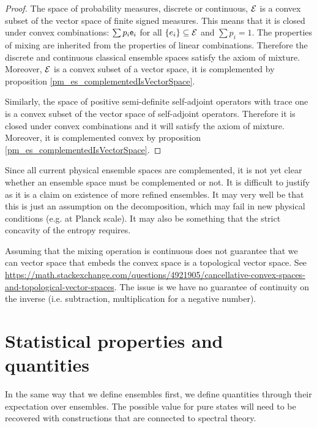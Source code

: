 \begin{proof}
	The space of probability measures, discrete or continuous, $\mathcal{E}$ is a convex subset of the vector space of finite signed measures. This means that it is closed under convex combinations: $\sum p_i \mathsf{e}_i$ for all $\{e_i\} \subseteq \mathcal{E}$ and $\sum p_i = 1$. The properties of mixing are inherited from the properties of linear combinations. Therefore the discrete and continuous classical ensemble spaces satisfy the axiom of mixture. Moreover, $\mathcal{E}$ is a convex subset of a vector space, it is complemented by proposition \ref{pm_es_complementedIsVectorSpace}.
	
	Similarly, the space of positive semi-definite self-adjoint operators with trace one is a convex subset of the vector space of self-adjoint operators. Therefore it is closed under convex combinations and it will satisfy the axiom of mixture. Moreover, it is complemented convex by proposition \ref{pm_es_complementedIsVectorSpace}.
\end{proof}


\begin{remark}
	Since all current physical ensemble spaces are complemented, it is not yet clear whether an ensemble space must be complemented or not. It is difficult to justify as it is a claim on existence of more refined ensembles. It may very well be that this is just an assumption on the decomposition, which may fail in new physical conditions (e.g. at Planck scale). It may also be something that the strict concavity of the entropy requires.
\end{remark}

\begin{remark}
	Assuming that the mixing operation is continuous does not guarantee that we can vector space that embeds the convex space is a topological vector space. See \url{https://math.stackexchange.com/questions/4921905/cancellative-convex-spaces-and-topological-vector-spaces}. The issue is we have no guarantee of continuity on the inverse (i.e. subtraction, multiplication for a negative number).
\end{remark}

\section{Statistical properties and quantities}

In the same way that we define ensembles first, we define quantities through their expectation over ensembles. The possible value for pure states will need to be recovered with constructions that are connected to spectral theory.

